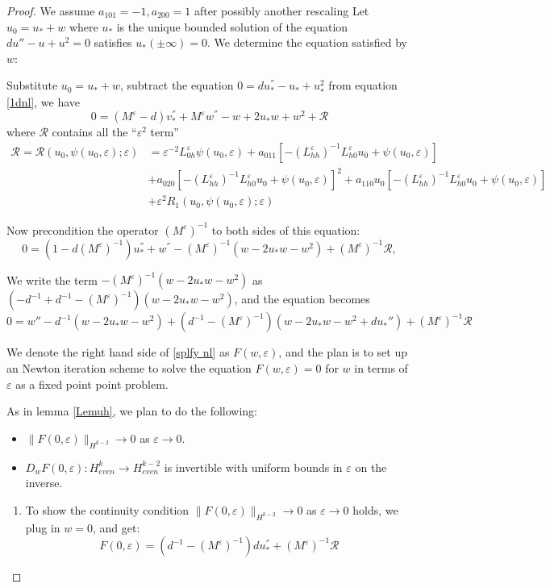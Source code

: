 \documentclass[letterpaper,11pt]{article}
\newcommand{\eps}{\varepsilon}
\numberwithin{equation}{section}
\theoremstyle{plain}
\begin{document}
\begin{proof}
We assume $a_{101}=-1, a_{200}=1$ after possibly another rescaling 
Let $u_0 = u_* + w$ where $u_*$ is the unique bounded solution of the equation $du''-u+u^2 = 0$ satisfies $u_*(\pm \infty) = 0$. We determine the equation satisfied by $w$:

Substitute $u_0= u_* + w$, subtract the equation $0 =d u_*^{''} - u_*+u_*^2$ from equation \eqref{1dnl}, we have
\[
0 = (M^\eps -d)v^{''}_* + M^\eps w^{''} -w+2u_*w+w^2+\mathcal{R}
\]
where $\mathcal{R}$ contains all the ``$\eps^2$ term''
\begin{align*}
\mathcal{R} =\mathcal{R} (u_0,\psi(u_0,\eps);\eps)&= \eps^{-2}L_{0h}^{\eps}\psi(u_0,\eps)+a_{011}[-(L_{hh}^{\eps})^{-1}L_{h0}^{\eps}u_0+\psi(u_0,\eps)]\\
&+a_{020}[-(L_{hh}^{\eps})^{-1}L_{h0}^{\eps}u_0+\psi(u_0,\eps)]^2+a_{110}u_0[-(L_{hh}^{\eps})^{-1}L_{h0}^{\eps}u_0+\psi(u_0,\eps)]\\
&+\eps^2R_1(u_0,\psi(u_0,\eps);\eps)
\end{align*}

Now precondition the operator $(M^{\eps})^{-1}$ to both sides of this equation:
\[
0 = (1-d(M^{\eps})^{-1})u_*^{''} + w^{''} -(M^{\eps})^{-1}( w -2u_*w - w^2)+(M^{\eps})^{-1}\mathcal{R},
\]


We write the term $-(M^{\eps})^{-1}(w-2u_*w-w^2)$ as $(-d^{-1}+d^{-1}-(M^{\eps})^{-1})(w-2u_*w - w^2)$, and the equation becomes
\begin{equation}\label{splfy nl}
0 = w'' -d^{-1}(w -2u_* w - w^2) + (d^{-1}-(M^{\eps})^{-1})(w-2u_*w-w^2+du_*'')+(M^{\eps})^{-1}\mathcal{R}
\end{equation}


We denote the right hand side of \eqref{splfy nl} as $ F(w,\eps)$, and the plan is to set up an Newton iteration scheme to solve the equation $ F(w,\eps) =0$ for $w$ in terms of $\eps$ as a fixed point point problem.

As in lemma \ref{Lemuh}, we plan to do the following:
\begin{itemize}
\item $\|F(0,\eps)\|_{H^{k-2}} \to 0$ as $\eps \to 0$.
\item $D_wF(0,\eps): H^k_{even} \to H^{k-2}_{even}$ is invertible with uniform bounds in $\eps$ on the inverse.
\end{itemize}
\begin{enumerate}
\item To show the continuity condition $\|F(0,\eps)\|_{H^{k-2}} \to 0$ as $\eps \to 0$ holds, we plug in $w = 0$, and get:
\[
F(0,\eps) = (d^{-1}-(M^{\eps})^{-1})du_*^{''} + (M^{\eps})^{-1} \mathcal{R}
\] 


\end{enumerate}
\end{proof}
\end{document}
